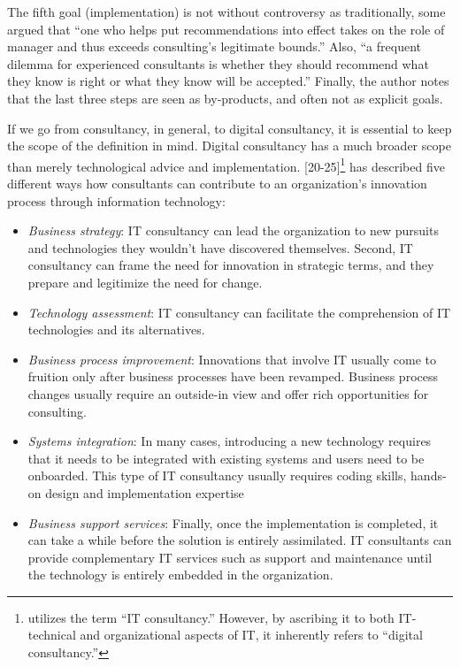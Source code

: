 \documentclass[12pt]{article}
\providecommand{\tightlist}{%
  \setlength{\itemsep}{0pt}\setlength{\parskip}{0pt}}
\begin{document}
The fifth goal (implementation) is not without controversy as
traditionally, some argued that ``one who helps put recommendations into
effect takes on the role of manager and thus exceeds consulting's
legitimate bounds.'' \citep{turner1982} Also, ``a frequent dilemma for
experienced consultants is whether they should recommend what they know
is right or what they know will be accepted.'' Finally, the author notes
that the last three steps are seen as by-products, and often not as
explicit goals.

If we go from consultancy, in general, to digital consultancy, it is
essential to keep the scope of the definition in mind. Digital
consultancy has a much broader scope than merely technological advice
and implementation. \citet{swanson2010} {[}20-25{]}\footnote{\citet{swanson2010}
  utilizes the term ``IT consultancy.'' However, by ascribing it to both
  IT-technical and organizational aspects of IT, it inherently refers to
  ``digital consultancy.''} has described five different ways how
consultants can contribute to an organization's innovation process
through information technology:

\begin{itemize}
\tightlist
\item
  \emph{Business strategy}: IT consultancy can lead the organization to
  new pursuits and technologies they wouldn't have discovered
  themselves. Second, IT consultancy can frame the need for innovation
  in strategic terms, and they prepare and legitimize the need for
  change.
\item
  \emph{Technology assessment}: IT consultancy can facilitate the
  comprehension of IT technologies and its alternatives.
\item
  \emph{Business process improvement}: Innovations that involve IT
  usually come to fruition only after business processes have been
  revamped. Business process changes usually require an outside-in view
  and offer rich opportunities for consulting.
\item
  \emph{Systems integration}: In many cases, introducing a new
  technology requires that it needs to be integrated with existing
  systems and users need to be onboarded. This type of IT consultancy
  usually requires coding skills, hands-on design and implementation
  expertise
\item
  \emph{Business support services}: Finally, once the implementation is
  completed, it can take a while before the solution is entirely
  assimilated. IT consultants can provide complementary IT services such
  as support and maintenance until the technology is entirely embedded
  in the organization.
\end{itemize}
\end{document}
